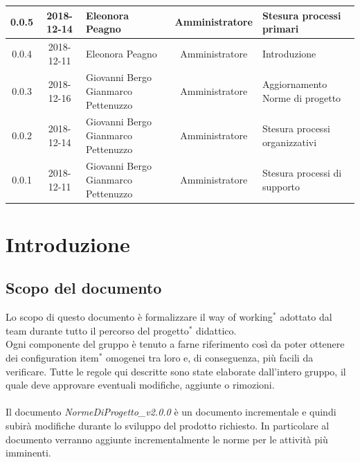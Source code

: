 \documentclass[11pt,a4paper]{article}
\begin{document}
{\begin{tabularx}{\textwidth}{ c | c | p{3.80cm} | c | X }
		0.0.5 & 2018-12-14 & Eleonora Peagno & Amministratore & Stesura processi primari \\ \hline
		0.0.4 & 2018-12-11 & Eleonora Peagno & Amministratore & Introduzione \\ \hline
		0.0.3 & 2018-12-16 & Giovanni Bergo \newline Gianmarco Pettenuzzo & Amministratore & Aggiornamento Norme di progetto \\ \hline
		0.0.2 & 2018-12-14 & Giovanni Bergo \newline Gianmarco Pettenuzzo & Amministratore & Stesura processi \newline organizzativi \\ \hline
		0.0.1 & 2018-12-11 & Giovanni Bergo \newline Gianmarco Pettenuzzo & Amministratore & Stesura processi di \newline supporto \\ \hline		
	\end{tabularx}
	
	\newpage	
	
	\renewcommand  \contentsname {\Large Indice} 
	
	\tableofcontents
	\newpage
	
	\section{Introduzione}
	\subsection{Scopo del documento}
	Lo scopo di questo documento è formalizzare il way of working$^*$ adottato dal team durante tutto il percorso del progetto$^*$ didattico. 
	\\Ogni componente del gruppo è tenuto a farne riferimento così da poter ottenere dei configuration item$^*$ omogenei tra loro e, di conseguenza, più facili da verificare. 
	Tutte le regole qui descritte sono state elaborate dall'intero gruppo, il quale deve approvare eventuali modifiche, aggiunte o rimozioni.
	\\\\
	Il documento \textit{NormeDiProgetto\_v2.0.0} è un documento incrementale e quindi subirà modifiche durante lo sviluppo del prodotto richiesto. In particolare al documento verranno aggiunte incrementalmente le norme per le attività più imminenti.
}
\end{document}
